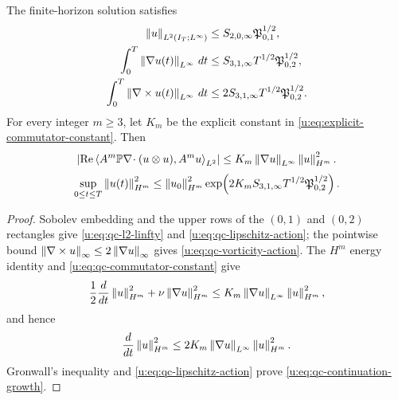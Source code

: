 \begin{proposition}
\label{u:prop:qc-continuation-norms}
The finite-horizon solution satisfies
\begin{align}
 \left\lVert u\right\rVert_{L^2(I_T;L^\infty)}
 &\le S_{2,0,\infty}\mathfrak P_{0,1}^{1/2},
 \label{u:eq:qc-l2-linfty}\\
 \int_0^T\left\lVert \nabla u(t)\right\rVert_{L^\infty}\,dt
 &\le S_{3,1,\infty}T^{1/2}\mathfrak P_{0,2}^{1/2},
 \label{u:eq:qc-lipschitz-action}\\
 \int_0^T\left\lVert \nabla\times u(t)\right\rVert_{L^\infty}\,dt
 &\le 2S_{3,1,\infty}T^{1/2}\mathfrak P_{0,2}^{1/2}.
 \label{u:eq:qc-vorticity-action}
\end{align}
For every integer \(m\ge3\), let \(K_m\) be the explicit constant in
\eqref{u:eq:explicit-commutator-constant}.  Then
\begin{equation}
 \left|\operatorname{Re}
 \left\langle A^m\mathbb P\nabla\!\cdot(u\otimes u),A^m u\right\rangle_{L^2}\right|
 \le K_m\left\lVert \nabla u\right\rVert_{L^\infty}\left\lVert u\right\rVert_{H^m}^2.
 \label{u:eq:qc-commutator-constant}
\end{equation}
\begin{equation}
 \sup_{0\le t\le T}\left\lVert u(t)\right\rVert_{H^m}^2
 \le
 \left\lVert u_0\right\rVert_{H^m}^2
 \exp\!\left(
 2K_mS_{3,1,\infty}T^{1/2}\mathfrak P_{0,2}^{1/2}
 \right).
 \label{u:eq:qc-continuation-growth}
\end{equation}
\end{proposition}

\begin{proof}
Sobolev embedding and the upper rows of the \((0,1)\) and \((0,2)\)
rectangles give \eqref{u:eq:qc-l2-linfty} and
\eqref{u:eq:qc-lipschitz-action}; the pointwise bound
\(\left\lVert \nabla\times u\right\rVert_\infty\le2\left\lVert \nabla u\right\rVert_\infty\) gives
\eqref{u:eq:qc-vorticity-action}.  The \(H^m\) energy identity and
\eqref{u:eq:qc-commutator-constant} give
\[
 \frac12\frac d{dt}\left\lVert u\right\rVert_{H^m}^2
 +\nu\left\lVert \nabla u\right\rVert_{H^m}^2
 \le K_m\left\lVert \nabla u\right\rVert_{L^\infty}\left\lVert u\right\rVert_{H^m}^2,
\]
and hence
\[
 \frac d{dt}\left\lVert u\right\rVert_{H^m}^2
 \le2K_m\left\lVert \nabla u\right\rVert_{L^\infty}\left\lVert u\right\rVert_{H^m}^2.
\]
Gronwall's inequality and \eqref{u:eq:qc-lipschitz-action} prove
\eqref{u:eq:qc-continuation-growth}.
\end{proof}

